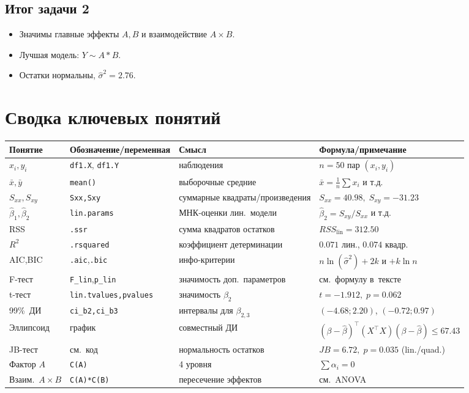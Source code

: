 \documentclass[12pt]{article}
\begin{document}
\subsection{Итог задачи 2}

\begin{itemize}
  \item Значимы главные эффекты \(A,B\) и взаимодействие \(A\times B\).
  \item Лучшая модель: \(Y\sim A*B\).
  \item Остатки нормальны, \(\hat\sigma^2 = 2.76\).
\end{itemize}

\section*{Сводка ключевых понятий}

\begin{longtable}{>{\raggedright}p{3cm}|p{4.5cm}|p{4.5cm}|p{4.5cm}}
\toprule
Понятие & Обозначение/переменная & Смысл & Формула/примечание\\
\midrule
\(x_i,y_i\) & \texttt{df1.X}, \texttt{df1.Y} & наблюдения & $n=50$ пар $(x_i,y_i)$\\
\(\bar x,\bar y\) & \texttt{mean()} & выборочные средние & $\bar x=\frac1n\sum x_i$ и т.д.\\
\(S_{xx},S_{xy}\) & \texttt{Sxx,Sxy} & суммарные квадраты/произведения & $S_{xx}=40.98,\;S_{xy}=-31.23$\\
\(\hat\beta_1,\hat\beta_2\) & \texttt{lin.params} & МНК‐оценки лин.\ модели & $\hat\beta_2=S_{xy}/S_{xx}$ и т.д.\\
RSS & \texttt{.ssr} & сумма квадратов остатков & $RSS_{\text{lin}}=312.50$\\
\(R^2\) & \texttt{.rsquared} & коэффициент детерминации & $0.071$ лин., $0.074$ квадр.\\
AIC,BIC & \texttt{.aic},\texttt{.bic} & инфо-критерии & $n\ln(\hat\sigma^2)+2k$ и $+k\ln n$\\
F-тест & \texttt{F\_lin},\texttt{p\_lin} & значимость доп.\ параметров & см.~формулу в~тексте\\
t-тест & \texttt{lin.tvalues,pvalues} & значимость $\beta_2$ & $t=-1.912,\;p=0.062$\\
99\%~ДИ & \texttt{ci\_b2,ci\_b3} & интервалы для $\beta_{2,3}$ & $(-4.68;2.20)$, $(-0.72;0.97)$\\
Эллипсоид & график & совместный ДИ & $(\beta-\hat\beta)^{\!\top}(X^\top X)(\beta-\hat\beta)\le67.43$\\
JB-тест & см.~код & нормальность остатков & $JB=6.72,\;p=0.035$ (lin./quad.)\\
Фактор \(A\) & \texttt{C(A)} & 4 уровня & $\sum\alpha_i=0$\\
Взаим.\ \(A\times B\) & \texttt{C(A)*C(B)} & пересечение эффектов & см.~ANOVA\\
\bottomrule
\end{longtable}
\end{document}
